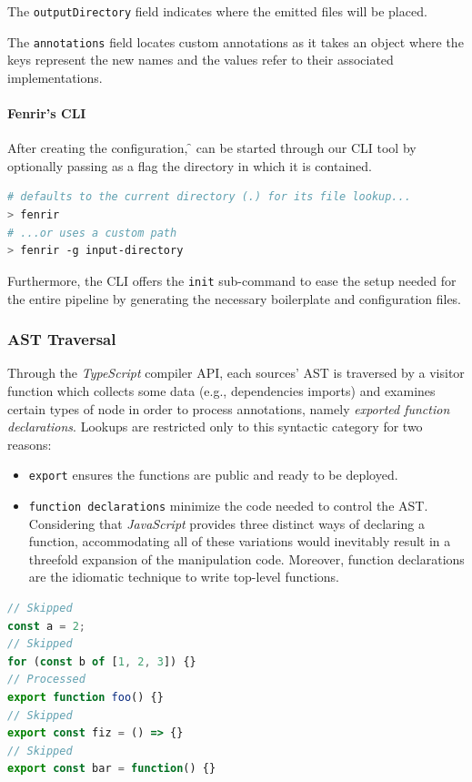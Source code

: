 The \verb|outputDirectory| field indicates where the emitted files will be placed.

The \verb|annotations| field locates custom annotations as it takes an object
where the keys represent the new names and the values refer to their associated implementations.

\paragraph{\textbf{Fenrir's CLI}}
After creating the configuration, \f{} can be started through our CLI tool
by optionally passing as a flag the directory in which it is contained.
\begin{lstlisting}[language=bash, style=bashstyle]
# defaults to the current directory (.) for its file lookup...
> fenrir
# ...or uses a custom path
> fenrir -g input-directory
\end{lstlisting}
Furthermore, the CLI offers the \verb|init| sub-command to ease the setup needed for the entire pipeline
by generating the necessary boilerplate and configuration files.

\subsubsection{AST Traversal}

Through the \textit{TypeScript} compiler API, each sources' AST is traversed
by a visitor function which collects some data (e.g., dependencies imports) and examines
certain types of node in order to process annotations, namely \textit{exported function declarations}.
Lookups are restricted only to this syntactic category for two reasons:
\begin{itemize}
  \item \verb|export| ensures the functions are public and ready to be deployed.
  \item \verb|function declarations| minimize the code needed to control the AST.
    Considering that \textit{JavaScript} provides three distinct ways of declaring a function,
    accommodating all of these variations would inevitably result in a threefold expansion of the manipulation code.
    Moreover, function declarations are the idiomatic technique to write top-level functions.
\end{itemize}

\begin{lstlisting}[language=javascript, caption={Examples of processed or skipped nodes.}]
// Skipped
const a = 2;
// Skipped
for (const b of [1, 2, 3]) {}
// Processed
export function foo() {}
// Skipped
export const fiz = () => {}
// Skipped
export const bar = function() {}
\end{lstlisting}

